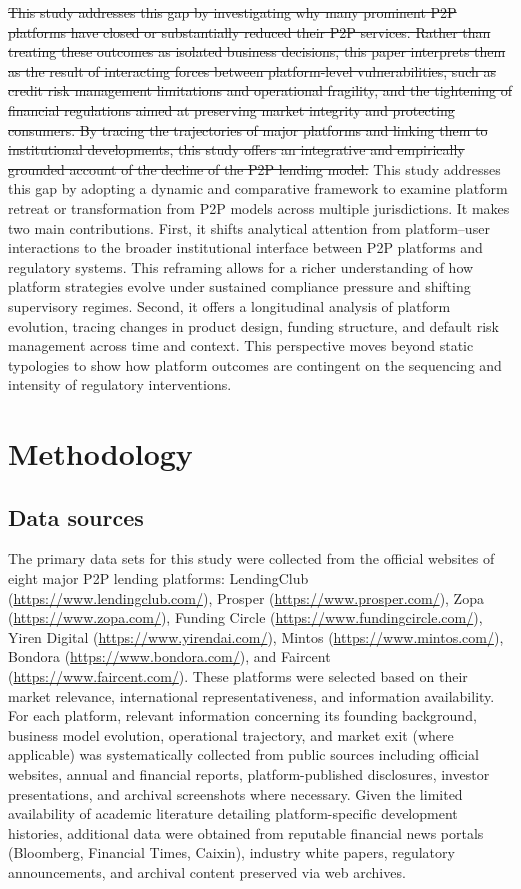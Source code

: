 \documentclass[pdflatex,sn-apa]{sn-jnl}%
\theoremstyle{thmstyleone}%
\theoremstyle{thmstyletwo}%
\theoremstyle{thmstylethree}%
\begin{document}
\sout{This study addresses this gap by investigating why many prominent P2P platforms have closed or substantially reduced their P2P services. Rather than treating these outcomes as isolated business decisions, this paper interprets them as the result of interacting forces between platform-level vulnerabilities, such as credit risk management limitations and operational fragility, and the tightening of financial regulations aimed at preserving market integrity and protecting consumers. By tracing the trajectories of major platforms and linking them to institutional developments, this study offers an integrative and empirically grounded account of the decline of the P2P lending model.} \textcolor{NavyBlue}{This study addresses this gap by adopting a dynamic and comparative framework to examine platform retreat or transformation from P2P models across multiple jurisdictions. It makes two main contributions. First, it shifts analytical attention from platform–user interactions to the broader institutional interface between P2P platforms and regulatory systems. This reframing allows for a richer understanding of how platform strategies evolve under sustained compliance pressure and shifting supervisory regimes. Second, it offers a longitudinal analysis of platform evolution, tracing changes in product design, funding structure, and default risk management across time and context. This perspective moves beyond static typologies to show how platform outcomes are contingent on the sequencing and intensity of regulatory interventions.}




\section{Methodology}
\label{sec: methodology}
\subsection{Data sources}
The primary data sets for this study were collected from the official websites of eight major P2P lending platforms: LendingClub (\url{https://www.lendingclub.com/}), Prosper (\url{https://www.prosper.com/}), Zopa (\url{https://www.zopa.com/}), Funding Circle (\url{https://www.fundingcircle.com/}), Yiren Digital (\url{https://www.yirendai.com/}), Mintos (\url{https://www.mintos.com/}), Bondora (\url{https://www.bondora.com/}), and Faircent (\url{https://www.faircent.com/}). These platforms were selected based on their market relevance, international representativeness, and information availability. For each platform, relevant information concerning its founding background, business model evolution, operational trajectory, and market exit (where applicable) was systematically collected from public sources including official websites, annual and financial reports, platform-published disclosures, investor presentations, and archival screenshots where necessary. Given the limited availability of academic literature detailing platform-specific development histories, additional data were obtained from reputable financial news portals (Bloomberg, Financial Times, Caixin), industry white papers, regulatory announcements, and archival content preserved via web archives.
\end{document}
